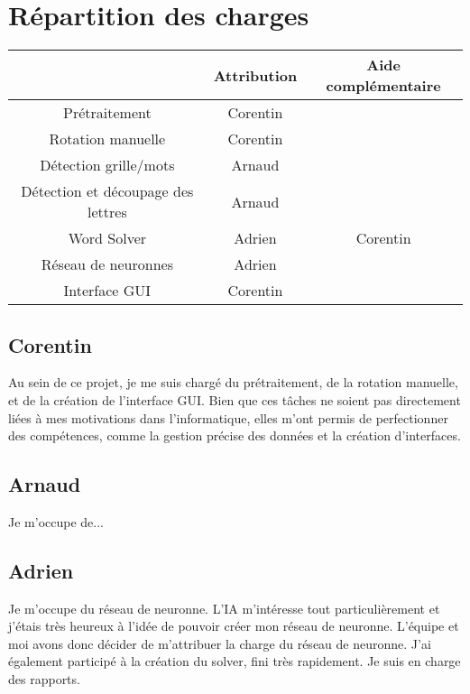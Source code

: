 \section{Répartition des charges}

\hfill

\begin{tabular}{ | c | c | c | }
\hline 
   & Attribution & Aide complémentaire\\
\hline 
   Prétraitement & Corentin &\\
\hline
   Rotation manuelle & Corentin &\\
\hline
   Détection grille/mots & Arnaud &  \\
\hline
   Détection et découpage des lettres & Arnaud & \\
\hline
   Word Solver & Adrien & Corentin \\
\hline
   Réseau de neuronnes & Adrien &  \\ 
\hline

   Interface GUI & Corentin & \\
\hline  
 \end{tabular}
\hfill \break

\subsection{Corentin}
\indent Au sein de ce projet, je me suis chargé du prétraitement, de la rotation manuelle, et de la création de l’interface GUI. Bien que ces tâches ne soient pas directement liées à mes motivations dans l'informatique, elles m'ont permis de perfectionner des compétences, comme la gestion précise des données et la création d’interfaces. \newline\newline
\subsection{Arnaud}
\indent Je m'occupe de...\newline\newline
\subsection{Adrien}
\indent Je m'occupe du réseau de neuronne. L'IA m'intéresse tout particulièrement et j'étais très heureux à l'idée de pouvoir créer mon réseau de neuronne. L'équipe et moi avons donc décider de m'attribuer la charge du réseau de neuronne. J'ai également participé à la création du solver, fini très rapidement. Je suis en charge des rapports. \newline\newline
